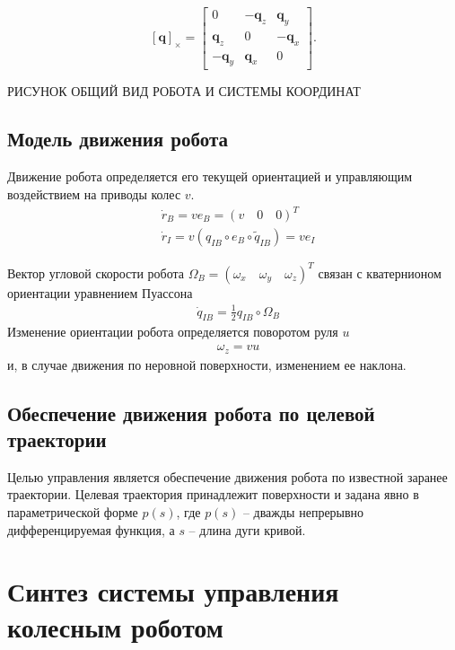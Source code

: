 \documentclass[a4paper,12pt]{article}
\begin{document}
\begin{equation} \label{eq:cross_operator}
[{\textbf{q}}]_{\times} =
\begin{bmatrix}
0            & -{\textbf{q}}_z   & {\textbf{q}}_y \\
{\textbf{q}}_z     & 0           &-{\textbf{q}}_x\\
-{\textbf{q}}_y    & {\textbf{q}}_x    & 0
\end{bmatrix}.
\end{equation}

РИСУНОК ОБЩИЙ ВИД РОБОТА И СИСТЕМЫ КООРДИНАТ

\subsection{Модель движения робота}
Движение робота определяется его текущей ориентацией и управляющим воздействием на приводы колес $v$.
\begin{align} \label{eq:model_velocity}
&\dot{r}_B = v e_B = (v \quad 0 \quad 0)^T \\
&\dot{r}_I = v (q_{IB} \circ e_B \circ \tilde{q}_{IB}) =
v e_I
\end{align}

Вектор угловой скорости робота $\Omega_B = (\omega_x \quad \omega_y \quad \omega_z)^T$ связан с кватернионом ориентации уравнением Пуассона
\begin{align}  \label{eq:model_rot_velocity}
&\dot{q}_{IB} = \frac{1}{2} q_{IB} \circ \Omega_{B}
\end{align}
Изменение ориентации робота определяется поворотом руля $u$
\begin{align}  \label{eq:model_rot_velocity_z}
&\omega_{z} = vu
\end{align}
и, в случае движения по неровной поверхности, изменением ее наклона.

\subsection{Обеспечение движения робота по целевой траектории}
Целью управления является обеспечение движения робота по известной заранее траектории.  Целевая траектория принадлежит поверхности и задана явно в параметрической форме $p(s)$, где $p(s)$ -- дважды непрерывно дифференцируемая функция, а $s$ -- длина дуги кривой.


\section{Синтез системы управления колесным роботом}
\end{document}
